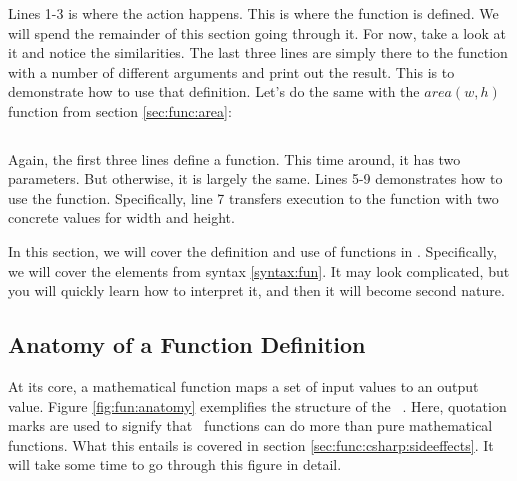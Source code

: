 \inputminted[linenos]{csharp}{../src/csharp/functions/f/Program.cs}

Lines 1-3 is where the action happens. This is where the function is defined. We will spend the remainder of this section going through it. For now, take a look at it and notice the similarities. The last three lines are simply there to  the  function with a number of different arguments and print out the result. This is to demonstrate how to use that definition. Let's do the same with the $area(w,h)$ function from section \ref{sec:func:area}:

\inputminted[linenos]{csharp}{../src/csharp/functions/area/Program.cs}

Again, the first three lines define a function. This time around, it has two parameters. But otherwise, it is largely the same. Lines 5-9 demonstrates how to use the function. Specifically, line 7 transfers execution to the function with two concrete values for width and height.

In this section, we will cover the definition and use of functions in \csharp. Specifically, we will cover the elements from syntax \ref{syntax:fun}. It may look complicated, but you will quickly learn how to interpret it, and then it will become second nature.

\begin{syntaxfloat}
  
  \caption{Functions.}
  \label{syntax:fun}
\end{syntaxfloat}

\subsection{Anatomy of a Function Definition}

At its core, a mathematical function maps a set of input values to an output value. Figure \ref{fig:fun:anatomy} exemplifies the structure of the \csharp\ . Here, quotation marks are used to signify that \csharp\ functions can do more than pure mathematical functions. What this entails is covered in section \ref{sec:func:csharp:sideeffects}. It will take some time to go through this figure in detail.

